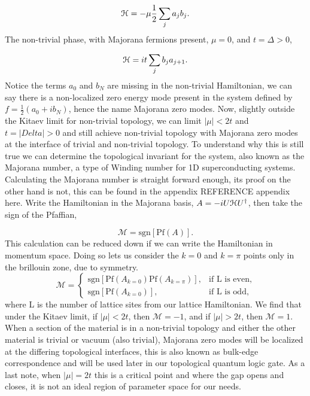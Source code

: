 \begin{equation}
  \mathcal{H} = -\mu\dfrac{1}{2} \sum_j a_j b_j.
\end{equation}
The non-trivial phase, with Majorana fermions present, $\mu = 0$, and $t = \Delta > 0$,

\begin{equation}
  \mathcal{H} = it \sum_j b_j a_{j+1}.
\end{equation}
Notice the terms $a_0$ and $b_N$ are missing in the non-trivial Hamiltonian, we can say there is a non-localized zero energy mode present in the system defined by $f = \tfrac{1}{2}(a_0 + i b_N)$, hence the name Majorana zero modes.
Now, slightly outside the Kitaev limit for non-trivial topology, we can limit $|\mu| < 2t$ and $t = |Delta| >0$ and still achieve non-trivial topology with Majorana zero modes at the interface of trivial and non-trivial topology.
To understand why this is still true we can determine the topological invariant for the system, also known as the Majorana number, a type of Winding number for 1D superconducting systems.
Calculating the Majorana number is straight forward enough, its proof on the other hand is not, this can be found in the appendix REFERENCE appendix here.
Write the Hamiltonian in the Majorana basis, $A = -iU \mathcal{H} U^{\dagger}$, then take the sign of the Pfaffian,

\begin{equation}
  \mathcal{M} = \text{sgn} [\text{Pf} (A)].
\end{equation}
This calculation can be reduced down if we can write the Hamiltonian in momentum space.
Doing so lets us consider the $k=0$ and $k=\pi$ points only in the brillouin zone, due to symmetry.
\begin{equation}
  \mathcal{M} =
  \begin{cases}
    \text{sgn} [\text{Pf} (A_{k=0}) \text{Pf} (A_{k=\pi})], &\text{if L is even}, \\
    \text{sgn} [\text{Pf} (A_{k=0})], &\text{if L is odd},
  \end{cases}
\end{equation}
where L is the number of lattice sites from our lattice Hamiltonian.
We find that under the Kitaev limit, if $|\mu|< 2t$, then $\mathcal{M} = -1$, and if $|\mu| > 2t$, then $\mathcal{M} = 1$.
When a section of the material is in a non-trivial topology and either the other material is trivial or vacuum (also trivial), Majorana zero modes will be localized at the differing topological interfaces, this is also known as bulk-edge correspondence and will be used later in our topological quantum logic gate.
As a last note, when $|\mu| = 2t$ this is a critical point and where the gap opens and closes, it is not an ideal region of parameter space for our needs.



